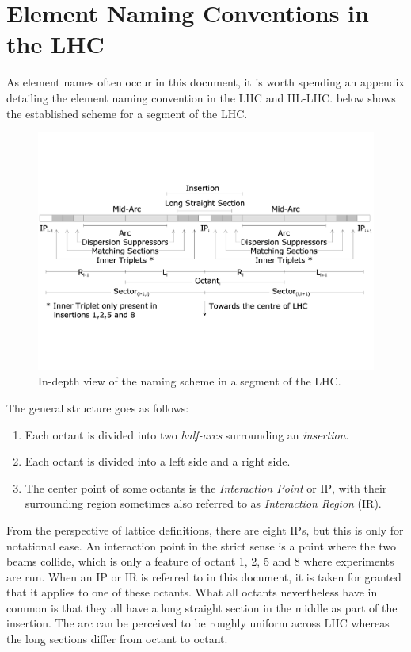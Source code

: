 \chapter{Element Naming Conventions in the LHC}
\label{appendix:naming_conventions}


As element names often occur in this document, it is worth spending an appendix detailing the element naming convention in the LHC and HL-LHC.
 below shows the established scheme for a segment of the LHC.

\begin{figure}[h]
    \centering
    \includegraphics*[width=0.9\linewidth]{Figures/Appendices/LHC_naming_scheme.pdf}
    \caption{In-depth view of the naming scheme in a segment of the LHC.}
    \label{figure:lhc_segment_naming_scheme}
  \end{figure}

The general structure goes as follows:
\begin{enumerate}
    \item Each octant is divided into two \textit{half-arcs} surrounding an \textit{insertion}.
    \item Each octant is divided into a left side and a right side.
    \item The center point of some octants is the \textit{Interaction Point} or \(\mathrm{IP}\), with their surrounding region sometimes also referred to as \textit{Interaction Region} (\(\mathrm{IR}\)).
\end{enumerate}

From the perspective of lattice definitions, there are eight \(\mathrm{IP}\)s, but this is only for notational ease.
An interaction point in the strict sense is a point where the two beams collide, which is only a feature of octant 1, 2, 5 and 8 where experiments are run.
When an \(\mathrm{IP}\) or \(\mathrm{IR}\) is referred to in this document, it is taken for granted that it applies to one of these octants.
What all octants nevertheless have in common is that they all have a long straight section in the middle as part of the insertion.
The arc can be perceived to be roughly uniform across LHC whereas the long sections differ from octant to octant.


